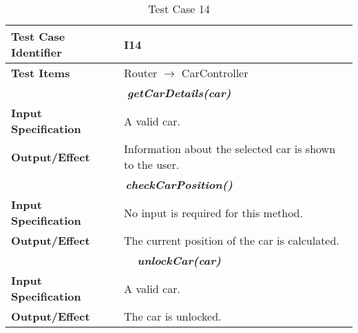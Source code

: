 \begin{table}[h]
	\begin{tabularx}{\textwidth}{l X}
		\hline
		\textbf{Test Case Identifier}	&	I14\\	\hline
		\textbf{Test Items}			&	Router $\rightarrow$ CarController \\	\hline\hline
		\multicolumn{2}{c}{\textbf{\textit{getCarDetails(car)}}}	\\	\hline
			\textbf{Input Specification}	&	A valid car.\\	\hline
			\textbf{Output/Effect}	&	Information about the selected car is shown to the user.\\	\hline\hline
		\multicolumn{2}{c}{\textbf{\textit{checkCarPosition()}}}	\\	\hline
			\textbf{Input Specification}	&	No input is required for this method.\\	\hline
			\textbf{Output/Effect}	&	The current position of the car is calculated.\\	\hline\hline
		\multicolumn{2}{c}{\textbf{\textit{unlockCar(car)}}}	\\	\hline
			\textbf{Input Specification}	&	A valid car.\\	\hline
			\textbf{Output/Effect}	&	The car is unlocked.\\	\hline
	\end{tabularx}
	\captionsetup{textformat=empty,labelformat=blank}
	\caption{Test Case 14}
	\label{table:template-table-14}
\end{table}
